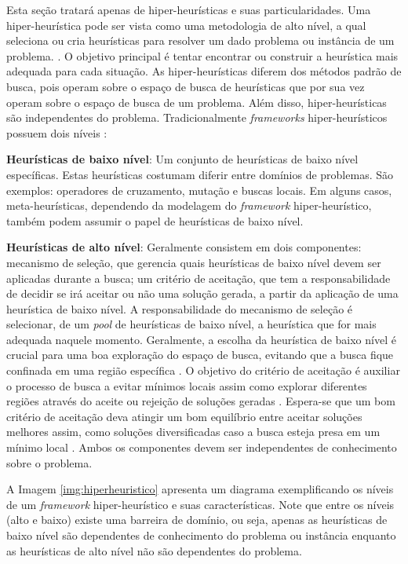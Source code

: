 Esta seção tratará apenas de hiper-heurísticas e suas particularidades. Uma hiper-heurística pode ser vista como uma metodologia de alto nível, a qual seleciona ou cria heurísticas para resolver um dado problema ou instância de um problema. \cite{burke2013hyper}. O objetivo principal é tentar encontrar ou construir a heurística mais adequada para cada situação. As hiper-heurísticas diferem dos métodos padrão de busca, pois operam sobre o espaço de busca de heurísticas que por sua vez operam sobre o espaço de busca de um problema. Além disso, hiper-heurísticas são independentes do problema. Tradicionalmente \textit{frameworks} hiper-heurísticos possuem dois níveis \cite{sabar2015automatic}: 

\textbf{Heurísticas de baixo nível}:  Um conjunto de heurísticas de baixo nível específicas. Estas heurísticas costumam diferir entre domínios de problemas. São exemplos: operadores de cruzamento, mutação e buscas locais. Em alguns casos, meta-heurísticas, dependendo da modelagem do \textit{framework} hiper-heurístico, também podem assumir o papel de heurísticas de baixo nível. 

\textbf{Heurísticas de alto nível}: Geralmente consistem em dois componentes: mecanismo de seleção, que gerencia quais heurísticas de baixo nível devem ser aplicadas durante a busca; um critério de aceitação, que tem a responsabilidade de decidir se irá aceitar ou não uma solução gerada, a partir da aplicação de uma heurística de baixo nível. A responsabilidade do mecanismo de seleção é selecionar, de um \textit{pool} de heurísticas de baixo nível, a heurística que for mais adequada naquele momento. Geralmente, a escolha da heurística de baixo nível é crucial para uma boa exploração do espaço de busca, evitando que a busca fique confinada em uma região específica \cite{sabar2015automatic}. O objetivo do critério de aceitação é auxiliar o processo de busca a evitar mínimos locais assim como explorar diferentes regiões através do aceite ou rejeição de soluções geradas \cite{chakhlevitch2008hyperheuristics}. Espera-se que um bom critério de aceitação deva atingir um bom equilíbrio entre aceitar soluções melhores assim, como soluções diversificadas caso a busca esteja presa em um mínimo local \cite{sabar2015automatic}. Ambos os componentes devem ser independentes de conhecimento sobre o problema.

A Imagem \ref{img:hiperheuristico} apresenta um diagrama exemplificando os níveis de um \textit{framework} hiper-heurístico e suas características. Note que entre os níveis (alto e baixo) existe uma barreira de domínio, ou seja, apenas as heurísticas de baixo nível são dependentes de conhecimento do problema ou instância enquanto as heurísticas de alto nível não são dependentes do problema. 

